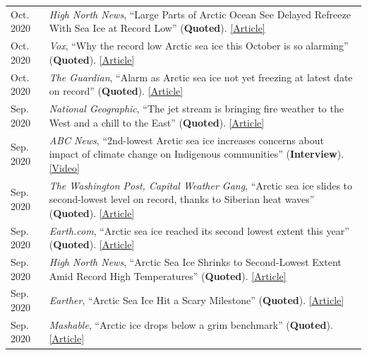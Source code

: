 \documentclass[margin,line,palatino,courier,10pt]{res}
\begin{document}
\begin{resume}
\begin{tabular}{@{}p{0.9in}p{4in}}
Oct. 2020 & \textit{High North News}, ``Large Parts of Arctic Ocean See Delayed Refreeze With Sea Ice at Record Low'' (\textbf{Quoted}). \href{https://www.highnorthnews.com/en/large-parts-arctic-ocean-see-delayed-refreeze-sea-ice-record-low}{[Article]}\\
Oct. 2020 & \textit{Vox}, ``Why the record low Arctic sea ice this October is so alarming'' (\textbf{Quoted}). \href{https://www.vox.com/21536859/arctic-sea-ice-2020-climate-change-alaska-polar-bears-charts}{[Article]}\\
Oct. 2020 & \textit{The Guardian}, ``Alarm as Arctic sea ice not yet freezing at latest date on record'' (\textbf{Quoted}). \href{https://www.theguardian.com/world/2020/oct/22/alarm-as-arctic-sea-ice-not-yet-freezing-at-latest-date-on-record}{[Article]}\\
Sep. 2020 & \textit{National Geographic}, ``The jet stream is bringing fire weather to the West and a chill to the East'' (\textbf{Quoted}). \href{https://www.nationalgeographic.com/science/2020/09/jet-stream-fire-weather-california-chill-eastern-us/}{[Article]}\\
Sep. 2020 & \textit{ABC News}, ``2nd-lowest Arctic sea ice increases concerns about impact of climate change on Indigenous communities'' (\textbf{Interview}). \href{https://abcnews.go.com/International/2nd-lowest-arctic-sea-ice-increases-concerns-impact/story?id=73224755}{[Video]}\\
Sep. 2020 & \textit{The Washington Post, Capital Weather Gang}, ``Arctic sea ice slides to second-lowest level on record, thanks to Siberian heat waves'' (\textbf{Quoted}). \href{https://www.washingtonpost.com/weather/2020/09/22/arctic-sea-ice-low/}{[Article]}\\
Sep. 2020 & \textit{Earth.com}, ``Arctic sea ice reached its second lowest extent this year'' (\textbf{Quoted}). \href{https://www.earth.com/news/arctic-sea-ice-reached-its-second-lowest-extent-this-year/}{[Article]}\\
Sep. 2020 & \textit{High North News}, ``Arctic Sea Ice Shrinks to Second-Lowest Extent Amid Record High Temperatures'' (\textbf{Quoted}). \href{https://www.highnorthnews.com/en/arctic-sea-ice-shrinks-second-lowest-extent-amid-record-high-temperatures}{[Article]}\\
Sep. 2020 & \textit{Earther}, ``Arctic Sea Ice Hit a Scary Milestone'' (\textbf{Quoted}). \href{https://earther.gizmodo.com/arctic-sea-ice-hit-a-scary-milestone-1845133739}{[Article]}\\
Sep. 2020 & \textit{Mashable}, ``Arctic ice drops below a grim benchmark'' (\textbf{Quoted}). \href{https://mashable.com/article/arctic-sea-ice-decline-2020/}{[Article]}\\

\end{tabular}
\end{resume}
\end{document}
